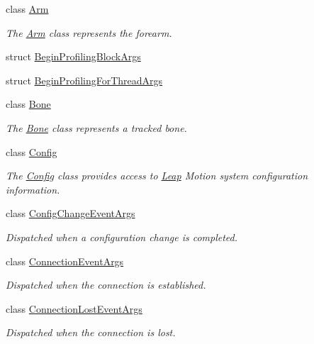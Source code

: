 \begin{DoxyCompactItemize}
\item 
class \mbox{\hyperlink{class_leap_1_1_arm}{Arm}}
\begin{DoxyCompactList}\small\item\em The \mbox{\hyperlink{class_leap_1_1_arm}{Arm}} class represents the forearm. \end{DoxyCompactList}\item 
struct \mbox{\hyperlink{struct_leap_1_1_begin_profiling_block_args}{Begin\+Profiling\+Block\+Args}}
\item 
struct \mbox{\hyperlink{struct_leap_1_1_begin_profiling_for_thread_args}{Begin\+Profiling\+For\+Thread\+Args}}
\item 
class \mbox{\hyperlink{class_leap_1_1_bone}{Bone}}
\begin{DoxyCompactList}\small\item\em The \mbox{\hyperlink{class_leap_1_1_bone}{Bone}} class represents a tracked bone. \end{DoxyCompactList}\item 
class \mbox{\hyperlink{class_leap_1_1_config}{Config}}
\begin{DoxyCompactList}\small\item\em The \mbox{\hyperlink{class_leap_1_1_config}{Config}} class provides access to \mbox{\hyperlink{namespace_leap}{Leap}} Motion system configuration information. \end{DoxyCompactList}\item 
class \mbox{\hyperlink{class_leap_1_1_config_change_event_args}{Config\+Change\+Event\+Args}}
\begin{DoxyCompactList}\small\item\em Dispatched when a configuration change is completed. \end{DoxyCompactList}\item 
class \mbox{\hyperlink{class_leap_1_1_connection_event_args}{Connection\+Event\+Args}}
\begin{DoxyCompactList}\small\item\em Dispatched when the connection is established. \end{DoxyCompactList}\item 
class \mbox{\hyperlink{class_leap_1_1_connection_lost_event_args}{Connection\+Lost\+Event\+Args}}
\begin{DoxyCompactList}\small\item\em Dispatched when the connection is lost. \end{DoxyCompactList}\item 

\end{DoxyCompactItemize}
